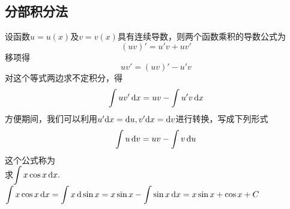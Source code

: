 	\subsection{分部积分法}
	设函数$u=u(x)$及$v=v(x)$具有连续导数，则两个函数乘积的导数公式为
	\begin{equation}
		(uv)'=u'v+uv'
	\end{equation} 
移项得
\begin{equation}
	uv'=(uv)'-u'v
	\end{equation}
对这个等式两边求不定积分，得
\begin{equation}
	\int uv' \,{\rm{d}} x=uv-\int u'v \,{\rm{d}} x
\end{equation}
方便期间，我们可以利用$u'{\rm{d}} x={\rm{d}} u,v'{\rm{d}} x={\rm{d}} v$进行转换，写成下列形式
\begin{equation}
	\int u \,{\rm{d}} v=uv-\int v \,{\rm{d}} u
\end{equation}
这个公式称为\\
\vspace{0.5em}
\examples 求$\displaystyle\int x\cos x \,{\rm{d}} x.$\\
\solve $\displaystyle\int x\cos x \,{\rm{d}} x=\int x \,{\rm{d}} \sin x=x\sin x-\int \sin x \,{\rm{d}} x=x\sin x+\cos x+C $